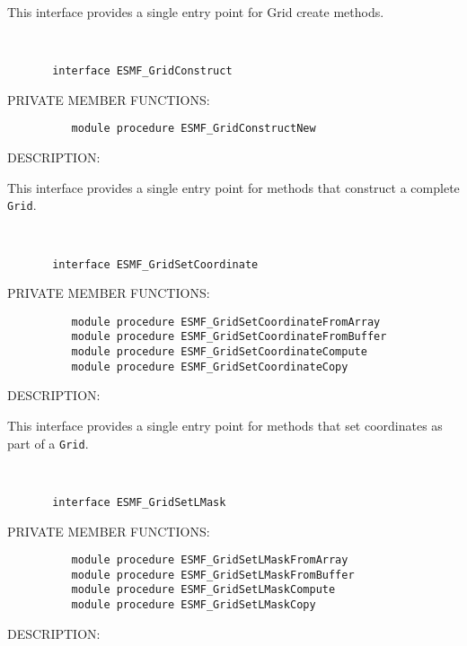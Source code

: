 {       This interface provides a single entry point for Grid create
       methods.
   
 
\mbox{}\hrulefill\ 
 

\begin{verbatim}       interface ESMF_GridConstruct
 \end{verbatim}{\sf PRIVATE MEMBER FUNCTIONS:}
\begin{verbatim}          module procedure ESMF_GridConstructNew
 \end{verbatim}
{\sf DESCRIPTION:\\ }


       This interface provides a single entry point for methods that construct a
       complete {\tt Grid}.
   
 
\mbox{}\hrulefill\ 
 

\begin{verbatim}       interface ESMF_GridSetCoordinate
 \end{verbatim}{\sf PRIVATE MEMBER FUNCTIONS:}
\begin{verbatim}          module procedure ESMF_GridSetCoordinateFromArray
          module procedure ESMF_GridSetCoordinateFromBuffer
          module procedure ESMF_GridSetCoordinateCompute
          module procedure ESMF_GridSetCoordinateCopy
 \end{verbatim}
{\sf DESCRIPTION:\\ }


       This interface provides a single entry point for methods that set
       coordinates as part of a {\tt Grid}.
   
 
\mbox{}\hrulefill\ 
 

\begin{verbatim}       interface ESMF_GridSetLMask
 \end{verbatim}{\sf PRIVATE MEMBER FUNCTIONS:}
\begin{verbatim}          module procedure ESMF_GridSetLMaskFromArray
          module procedure ESMF_GridSetLMaskFromBuffer
          module procedure ESMF_GridSetLMaskCompute
          module procedure ESMF_GridSetLMaskCopy
 \end{verbatim}
{\sf DESCRIPTION:\\ }


}
